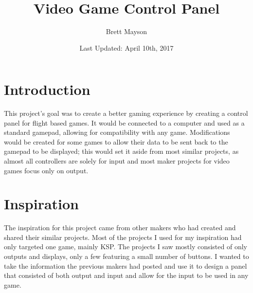 \documentclass[12pt,a4paper]{article}
\title{Video Game Control Panel}
\date{Last Updated: April 10th, 2017}
\author{Brett Mayson}
\begin{document}

\maketitle
\newpage
\tableofcontents
\newpage
\listoffigures
\printglossary[type=\acronymtype]
\newpage
{}

\linespread{1.5}

\section{Introduction}
\paragraph{}
This project's goal was to create a better gaming experience by creating a control panel for flight based games. It would be connected to a computer and used as a standard gamepad, allowing for compatibility with any game. Modifications would be created for some games to allow their data to be sent back to the gamepad to be displayed; this would set it aside from most similar projects, as almost all controllers are solely for input and most maker projects for video games focus only on output.
\section{Inspiration}
\paragraph{}
The inspiration for this project came from other makers who had created and shared their similar projects. Most of the projects I used for my inspiration had only targeted one game, mainly \gls{KSP}. The projects I saw mostly consisted of only outputs and displays, only a few featuring a small number of buttons. I wanted to take the information the previous makers had posted and use it to design a panel that consisted of both output and input and allow for the input to be used in any game.
\end{document}
